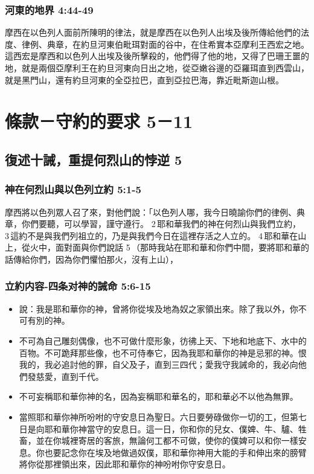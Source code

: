 \subsubsection{河東的地界 4:44-49}
摩西在以色列人面前所陳明的律法，就是摩西在以色列人出埃及後所傳給他們的法度、律例、典章，在約旦河東伯毗珥對面的谷中，在住希實本亞摩利王西宏之地。這西宏是摩西和以色列人出埃及後所擊殺的，他們得了他的地，又得了巴珊王噩的地，就是兩個亞摩利王在約旦河東向日出之地，從亞嫩谷邊的亞羅珥直到西雲山，就是黑門山，還有約旦河東的全亞拉巴，直到亞拉巴海，靠近毗斯迦山根。



\section{條款－守約的要求 5－11}
\subsection{復述十誡，重提何烈山的悖逆 5}
\subsubsection{神在何烈山與以色列立約 5:1-5}
摩西將以色列眾人召了來，對他們說：「以色列人哪，我今日曉諭你們的律例、典章，你們要聽，可以學習，謹守遵行。 2 耶和華我們的神在何烈山與我們立約， 3 這約不是與我們列祖立的，乃是與我們今日在這裡存活之人立的。 4 耶和華在山上，從火中，面對面與你們說話 5 （那時我站在耶和華和你們中間，要將耶和華的話傳給你們，因為你們懼怕那火，沒有上山），

\subsubsection{立約内容-四条对神的誡命 5:6-15}
\begin{itemize} 
\itemsep-.35em 
\item 說：我是耶和華你的神，曾將你從埃及地為奴之家領出來。除了我以外，你不可有別的神。
\item 不可為自己雕刻偶像，也不可做什麼形象，彷彿上天、下地和地底下、水中的百物。不可跪拜那些像，也不可侍奉它，因為我耶和華你的神是忌邪的神。恨我的，我必追討他的罪，自父及子，直到三四代；愛我守我誡命的，我必向他們發慈愛，直到千代。
\item 不可妄稱耶和華你神的名，因為妄稱耶和華名的，耶和華必不以他為無罪。
\item 當照耶和華你神所吩咐的守安息日為聖日。六日要勞碌做你一切的工，但第七日是向耶和華你神當守的安息日。這一日，你和你的兒女、僕婢、牛、驢、牲畜，並在你城裡寄居的客旅，無論何工都不可做，使你的僕婢可以和你一樣安息。你也要記念你在埃及地做過奴僕，耶和華你神用大能的手和伸出來的膀臂將你從那裡領出來，因此耶和華你的神吩咐你守安息日。
\end{itemize}

